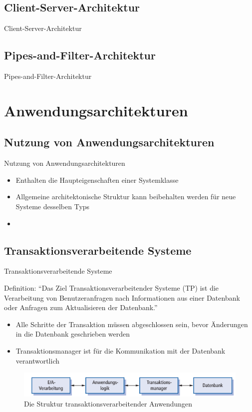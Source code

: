 \documentclass{beamer}
\begin{document}
			\subsection{Client-Server-Architektur}
			\begin{frame}{Client-Server-Architektur}
			
			\end{frame}
			\subsection{Pipes-and-Filter-Architektur}
			\begin{frame}{Pipes-and-Filter-Architektur}
			
			\end{frame}	
	\section{Anwendungsarchitekturen}
		\subsection{Nutzung von Anwendungsarchitekturen}
			\begin{frame}{Nutzung von Anwendungsarchitekturen}
				\begin{itemize} %
					\item Enthalten die Haupteigenschaften einer Systemklasse
					\item Allgemeine architektonische Struktur kann beibehalten werden für neue Systeme desselben Typs
					\item
				\end{itemize}
			\end{frame}
		\subsection{Transaktionsverarbeitende Systeme}
			\begin{frame}{Transaktionsverarbeitende Systeme}
				\begin{block}{Definition:}
					\enquote{Das Ziel Transaktionsverarbeitender Systeme (TP) ist die Verarbeitung von Benutzeranfragen nach Informationen aus einer Datenbank oder Anfragen zum Aktualisieren der Datenbank.} \cite[S. 204]{sommer}
				\end{block}
				\begin{itemize}
					\item Alle Schritte der Transaktion müssen abgeschlossen sein, bevor Änderungen in die Datenbank geschrieben werden
					\item Transaktionsmanager ist für die Kommunikation mit der Datenbank verantwortlich
				\end{itemize}
				\begin{figure}
					\includegraphics[width=\textwidth]{transaktionssystem-1.png}
					\caption{Die Struktur transaktionsverarbeitender Anwendungen \cite[S. 204]{sommer}}
				\end{figure}
			\end{frame}
\end{document}
